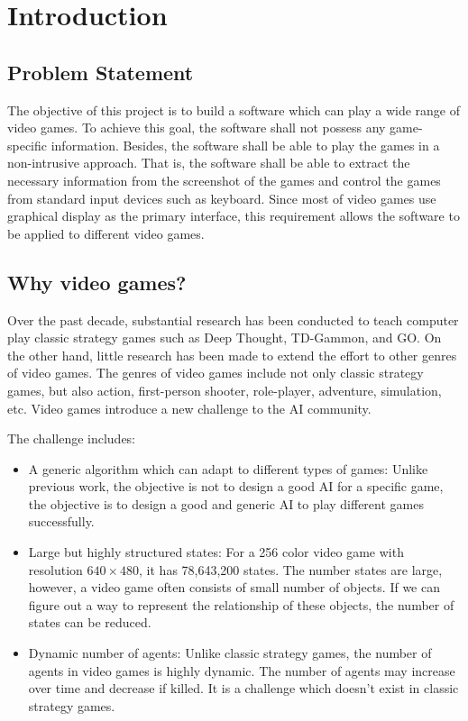 
\chapter{Introduction}
\label{ch:intro}

\section{Problem Statement}
The objective of this project is to build a software which can play a wide range 
of video games. To achieve this goal, the software shall not possess any game-specific 
information. Besides, the software shall be able to play the games in a non-intrusive approach.
That is, the software shall be able to extract the necessary information 
from the screenshot of the games and control the games from standard input devices such as keyboard.
Since most of video games use graphical display as the primary interface, this requirement allows
the software to be applied to different video games.

\section{Why video games?}
Over the past decade, substantial research has been conducted to teach computer play classic strategy games such
as Deep Thought\cite{DeepBlue}, TD-Gammon\cite{Gammon}, and GO\cite{Go}.
On the other hand, little research has been made\cite{FPS}\cite{Mario} to extend the effort to other genres of video games.
The genres of video games include not only classic strategy games, but also action, first-person shooter, role-player, adventure, simulation, etc.
Video games introduce a new challenge to the AI community.

The challenge includes:
\begin{itemize}{}

\item A generic algorithm which can adapt to different types of games:
Unlike previous work, the objective is not to design a good AI for a specific game, the objective is
to design a good and generic AI to play different games successfully.

\item Large but highly structured states:
For a 256 color video game with resolution $640 \times 480$, it has 78,643,200 states.
The number states are large, however, a video game often consists of small number of objects.
If we can figure out a way to represent the relationship of these objects, the number of states
can be reduced.

\item Dynamic number of agents:
Unlike classic strategy games, the number of agents in video games is highly dynamic.
The number of agents may increase over time and decrease if killed.
It is a challenge which doesn't exist in classic strategy games.
\end{itemize}

